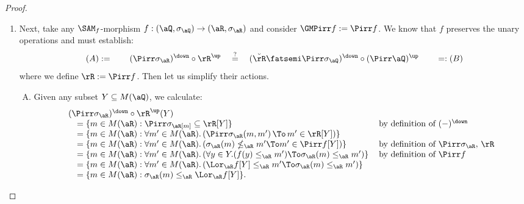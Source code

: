 \documentclass{article}
\begin{document}
\begin{proof}
\begin{enumerate}
\bigskip
\item
Next, take any $\SAM_f$-morphism $f : (\aQ,\sigma_\aQ) \to (\aR,\sigma_\aR)$ and consider $\GMPirr f := \Pirr f$. We know that $f$ preserves the unary operations and must establish:
\[
(A) := \qquad
(\Pirr\sigma_\aR)^\down \circ \rR^\up
\quad\stackrel{?}{=}\quad
(\breve{\rR} \fatsemi \Pirr\sigma_\aQ)^\down \circ (\Pirr\aQ)^\up
\qquad =: (B)
\]
where we define $\rR := \Pirr f$. Then let us simplify their actions.
\begin{enumerate}[(A)]
\item
Given any subset $Y \subseteq M(\aQ)$, we calculate:
\[
\begin{tabular}{lll}
$(\Pirr\sigma_\aR)^\down \circ \rR^\up(Y)$
\\ \quad
$= \{ m \in M(\aR) : \Pirr\sigma_\aR[m] \subseteq \rR[Y] \}$
& by definition of $(-)^\down$
\\ \quad
$= \{ m \in M(\aR) : \forall m' \in M(\aR).\,( \Pirr\sigma_\aR(m,m') \, \To \, m' \in \rR[Y]  ) \}$
\\ \quad
$= \{ m \in M(\aR) : \forall m' \in M(\aR).\,( \sigma_\aR(m) \nleq_\aR m' \To m' \in \Pirr f[Y]  )\}$
& by definition of $\Pirr\sigma_\aR$, $\rR$
\\ \quad
$= \{ m \in M(\aR) : \forall m' \in M(\aR).\,(\forall y \in Y.(f(y) \leq_\aR m')  \To \sigma_\aR(m) \leq_\aR m' )\}$
& by definition of $\Pirr f$
\\ \quad
$= \{ m \in M(\aR) : \forall m' \in M(\aR).\,(\Lor_\aR f[Y] \leq_\aR m'  \To \sigma_\aR(m) \leq_\aR m' )\}$
\\ \quad
$= \{ m \in M(\aR) : \sigma_\aR(m) \leq_\aR \Lor_\aR f[Y] \}$.
\end{tabular}
\]


\end{enumerate}
\end{enumerate}
\end{proof}
\end{document}
